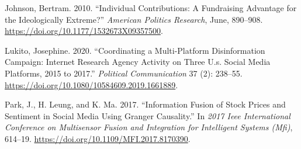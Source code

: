 \documentclass[12pt,]{article}
\begin{document}
\leavevmode\hypertarget{ref-johnson2010}{}%
Johnson, Bertram. 2010. ``Individual Contributions: A Fundraising
Advantage for the Ideologically Extreme?'' \emph{American Politics
Research}, June, 890--908.
\url{https://doi.org/10.1177/1532673X09357500}.

\leavevmode\hypertarget{ref-lukito2020}{}%
Lukito, Josephine. 2020. ``Coordinating a Multi-Platform Disinformation
Campaign: Internet Research Agency Activity on Three U.s. Social Media
Platforms, 2015 to 2017.'' \emph{Political Communication} 37 (2):
238--55. \url{https://doi.org/10.1080/10584609.2019.1661889}.

\leavevmode\hypertarget{ref-park2017}{}%
Park, J., H. Leung, and K. Ma. 2017. ``Information Fusion of Stock
Prices and Sentiment in Social Media Using Granger Causality.'' In
\emph{2017 Ieee International Conference on Multisensor Fusion and
Integration for Intelligent Systems (Mfi)}, 614--19.
\url{https://doi.org/10.1109/MFI.2017.8170390}.





\newpage
\singlespacing 
\end{document}

